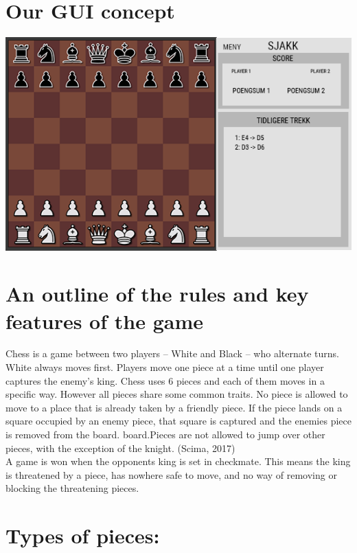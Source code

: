 \documentclass{article}
\begin{document}
    \section{Our GUI concept}
    \begin{center}
        \includegraphics[scale=0.6]{mockup_chess.png}
    \end{center}

    
    
    \section{An outline of the rules and key features of the game}
    \noindent
    Chess is a game between two players  -- White and Black -- who alternate turns. White always moves first. Players move one piece at a time until one player captures the enemy's king.  Chess uses 6 pieces and each of them moves in a specific way. However all pieces share some common traits. No piece is allowed to move to a place that is already taken by a friendly piece. If the piece lands on a square occupied by an enemy piece, that square is captured and the enemies piece is removed from the board. board.Pieces are not allowed to jump over other pieces, with the exception of the knight. (Scima, 2017)\\
A game is won when the opponents king is set in checkmate. This means the king is threatened by a piece, has nowhere
safe to move, and no way of removing or blocking the threatening pieces.\\


\section{Types of pieces:}
\end{document}
